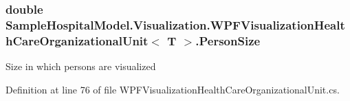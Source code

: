 \subsubsection[{\texorpdfstring{Person\+Size}{PersonSize}}]{\setlength{\rightskip}{0pt plus 5cm}double {\bf Sample\+Hospital\+Model.\+Visualization.\+W\+P\+F\+Visualization\+Health\+Care\+Organizational\+Unit}$<$ T $>$.Person\+Size\hspace{0.3cm}{\ttfamily [get]}}\hypertarget{class_sample_hospital_model_1_1_visualization_1_1_w_p_f_visualization_health_care_organizational_unit_adf438c4174f92739e98f5717276878ec}{}\label{class_sample_hospital_model_1_1_visualization_1_1_w_p_f_visualization_health_care_organizational_unit_adf438c4174f92739e98f5717276878ec}


Size in which persons are visualized 



Definition at line 76 of file W\+P\+F\+Visualization\+Health\+Care\+Organizational\+Unit.\+cs.

